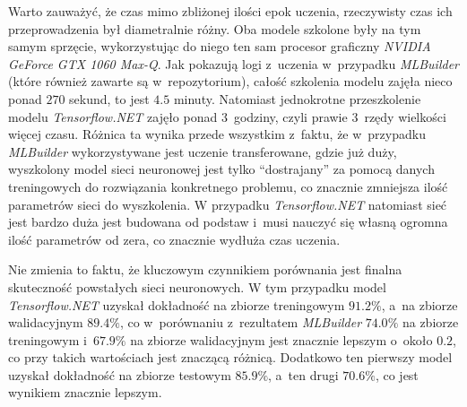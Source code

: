 Warto zauważyć, że czas mimo zbliżonej ilości epok uczenia, rzeczywisty czas ich przeprowadzenia był diametralnie różny.
Oba modele szkolone były na tym samym sprzęcie, wykorzystując do niego ten sam procesor graficzny \emph{NVIDIA GeForce GTX 1060 Max-Q}.
Jak pokazują logi z~uczenia w~przypadku \emph{MLBuilder} (które również zawarte są w~repozytorium), całość szkolenia modelu zajęła nieco ponad $270$ sekund, to jest $4.5$ minuty.
Natomiast jednokrotne przeszkolenie modelu \emph{Tensorflow.NET} zajęło ponad 3~godziny, czyli prawie 3~rzędy wielkości więcej czasu.
Różnica ta wynika przede wszystkim z~faktu, że w~przypadku \emph{MLBuilder} wykorzystywane jest uczenie transferowane, gdzie już duży, wyszkolony model sieci neuronowej jest tylko ``dostrajany'' za pomocą danych treningowych do rozwiązania konkretnego problemu, co znacznie zmniejsza ilość parametrów sieci do wyszkolenia.
W przypadku \emph{Tensorflow.NET} natomiast sieć jest bardzo duża jest budowana od podstaw i~musi nauczyć się własną ogromna ilość parametrów od zera, co znacznie wydłuża czas uczenia.

Nie zmienia to faktu, że kluczowym czynnikiem porównania jest finalna skuteczność powstałych sieci neuronowych.
W tym przypadku model \emph{Tensorflow.NET} uzyskał dokładność na zbiorze treningowym $91.2\%$, a~na zbiorze walidacyjnym $89.4\%$, co w~porównaniu z~rezultatem \emph{MLBuilder} $74.0\%$ na zbiorze treningowym i~$67.9\%$ na zbiorze walidacyjnym jest znacznie lepszym o~około $0.2$, co przy takich wartościach jest znaczącą różnicą.
Dodatkowo ten pierwszy model uzyskał dokładność na zbiorze testowym $85.9\%$, a~ten drugi $70.6\%$, co jest wynikiem znacznie lepszym.

